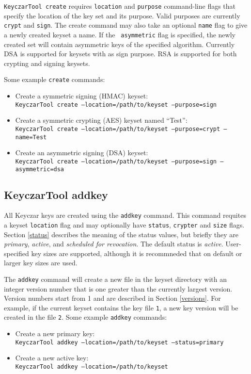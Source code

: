 \documentclass{llncs}
\begin{document}
{\tt KeyczarTool create} requires {\tt location} and {\tt purpose} command-line
flags that specify the location of the key set and its purpose. Valid purposes
are currently {\tt crypt} and {\tt sign}. The create command may also take
an optional {\tt name} flag to give a newly created keyset a name. If the {\tt
asymmetric} flag is specified, the newly created set will contain asymmetric
keys of the specified algorithm. Currently DSA is supported for keysets with
as sign purpose. RSA is supported for both crypting and signing keysets.

Some example {\tt create} commands:
\begin{itemize}
\item Create a symmetric signing (HMAC) keyset: \\
{\tt KeyczarTool create --location=/path/to/keyset --purpose=sign}
\item Create a symmetric crypting (AES) keyset named ``Test'': \\
{\tt KeyczarTool create --location=/path/to/keyset --purpose=crypt --name=Test}
\item Create an asymmetric signing (DSA) keyset: \\
{\tt KeyczarTool create --location=/path/to/keyset --purpose=sign
--asymmetric=dsa}
\end{itemize}

\subsection{KeyczarTool addkey}

All Keyczar keys are created using the {\tt addkey} command. This command
requites a keyset {\tt location} flag and may optionally have {\tt status},
{\tt crypter} and {\tt size} flags. Section \ref{status} describes the meaning
of the status values, but briefly they are {\it primary}, {\it active}, and {\it
scheduled for revocation}. The default status is {\it active}. User-specified
key sizes are supported, although it is recommneded that on default or larger
key  sizes are used.

The {\tt addkey} command will create a new file in the keyset directory with an
integer version number that is one greater than the currently largest version.
Version numbers start from 1 and are described in Section \ref{versions}. For
example, if the current keyset contains the key file {\tt 1}, a new key version
will be created in the file {\tt 2}. Some example {\tt addkey} commands:
\begin{itemize}
\item Create a new primary key: \\
{\tt KeyczarTool addkey --location=/path/to/keyset --status=primary}
\item Create a new active key: \\
{\tt KeyczarTool addkey --location=/path/to/keyset} 
\end{itemize}
\end{document}
